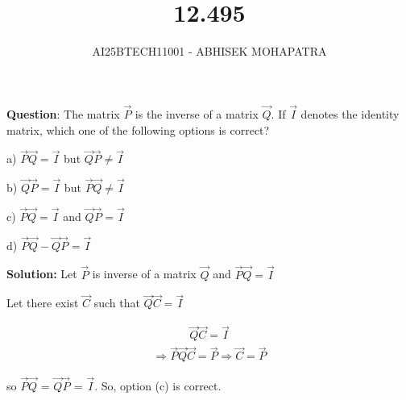 \documentclass{beamer}
\title{12.495}
\author{AI25BTECH11001 - ABHISEK MOHAPATRA}
\numberwithin{equation}{section}
\begin{document}
{\let\newpage\relax\maketitle}
\renewcommand{\thefigure}{\theenumi}
\renewcommand{\thetable}{\theenumi}

	 	\textbf{Question}:
The matrix $\vec{P}$ is the inverse of a matrix $\vec{Q}$. If $\vec{I}$ denotes the identity matrix, which one of the following options is correct?

a) $\vec{P}\vec{Q} = \vec{I}$ but $\vec{Q}\vec{P} \neq \vec{I}$

b) $\vec{Q}\vec{P} = \vec{I}$ but $\vec{P}\vec{Q} \neq \vec{I}$

c) $\vec{P}\vec{Q} = \vec{I}$ and $\vec{Q}\vec{P} = \vec{I}$

d) $\vec{P}\vec{Q} - \vec{Q}\vec{P} = \vec{I}$

		\textbf{Solution:}
Let $\vec{P}$ is inverse of a matrix $\vec{Q}$ and $\vec{P}\vec{Q} = \vec{I}$

Let there exist $\vec{C}$ such that $\vec{Q}\vec{C} = \vec{I}$

\begin{align}
		\vec{Q}\vec{C} = \vec{I}
\end{align}
\begin{align}
		\Rightarrow \vec{P}\vec{Q}\vec{C} = \vec{P} \Rightarrow \vec{C} = \vec{P}
\end{align}

so $\vec{P}$$\vec{Q}$ = $\vec{Q}$$\vec{P}$ = $\vec{I}$.
So, option (c) is correct.
\end{document}
